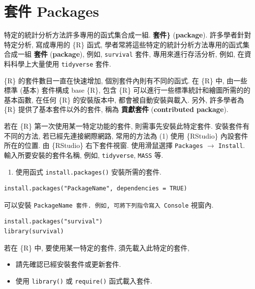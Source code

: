\documentclass[
]{book}
\providecommand{\tightlist}{%
  \setlength{\itemsep}{0pt}\setlength{\parskip}{0pt}}
\begin{document}
\hypertarget{ux5957ux4ef6-packages}{%
\section{套件 Packages}\label{ux5957ux4ef6-packages}}

特定的統計分析方法許多專用的函式集合成一組.
\textbf{套件\}}
(\textbf{package}).
許多學者針對特定分析, 寫成專用的 \{R\} 函式,
學者常將這些特定的統計分析方法專用的函式集合成一組
\textbf{套件}
(\textbf{package}),
例如, \texttt{survival}
套件,
專用來進行存活分析,
例如, 在資料科學上大量使用 \texttt{tidyverse} 套件.

\{R\} 的套件數目一直在快速增加,
個別套件內則有不同的函式.
在 \{R\} 中,
由一些標準 (基本) 套件構成 base \{R\},
包含 \{R\} 可以進行一些標準統計和繪圖所需的的基本函數,
在任何 \{R\} 的安裝版本中, 都會被自動安裝與載入.
另外, 許多學者為 \{R\} 提供了基本套件以外的套件,
稱為
\textbf{貢獻套件}
(\textbf{contributed package}).

若在 \{R\} 第一次使用某一特定功能的套件,
則需事先安裝此特定套件.
安裝套件有不同的方法, 若已經先連接網際網路,
常用的方法為
(1) 使用 \{RStudio\} 內設套件所在的位置.
由 \{RStudio\} 右下套件視窗.
使用滑鼠選擇 \texttt{Packages} \(\rightarrow\) \texttt{Install}.
輸入所要安裝的套件名稱, 例如,
\texttt{tidyverse},
\texttt{MASS} 等.

\begin{enumerate}
\def\labelenumi{(\arabic{enumi})}
\setcounter{enumi}{1}
\tightlist
\item
  使用函式 \texttt{install.packages()}
  安裝所需的套件.\\
\end{enumerate}

\begin{verbatim}
install.packages("PackageName", dependencies = TRUE)         
\end{verbatim}

可以安裝 \texttt{PackageName\textasciigrave{}\ 套件.\ 例如,\ 可將下列指令寫入\ \textasciigrave{}Console} 視窗內.

\begin{verbatim}
install.packages("survival")
library(survival)
\end{verbatim}

若在 \{R\} 中, 要使用某一特定的套件,
須先載入此特定的套件,

\begin{itemize}
\tightlist
\item
  請先確認已經安裝套件或更新套件.
\item
  使用 \texttt{library()} 或 \texttt{require()} 函式載入套件.
\end{itemize}
\end{document}
